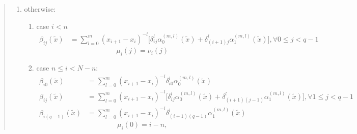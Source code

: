 \documentclass[11pt]{article}
\begin{document}
\begin{quotation}
\begin{enumerate}
\begin{enumerate}
                    \item
                        otherwise:
                        \begin{enumerate}
                            \item
                                case $i < n$
                                \begin{align}
                                    \beta_{ij}(\tilde{x}) &=
                                        \sum_{l = 0}^m
                                        (x_{i+1} - x_i)^{-l}
                                        \Big[\delta_{ij}^l \alpha_0^{(m, l)}(\tilde{x}) +
                                             \delta_{(i+1)j}^l \alpha_1^{(m, l)}(\tilde{x})\Big],
                                    \forall 0 \leq j < q - 1
                                \end{align}
                                \begin{equation}
                                    \mu_i(j) = \nu_i(j)
                                \end{equation}
                            \item
                                case $n \leq i < N - n$:
                                \begin{align}
                                    \beta_{i0}(\tilde{x}) &=
                                        \sum_{l = 0}^m
                                        (x_{i+1} - x_i)^{-l}
                                        \delta_{i0}^l \alpha_0^{(m, l)}(\tilde{x}) \\
                                    \beta_{ij}(\tilde{x}) &=
                                        \sum_{l = 0}^m
                                        (x_{i+1} - x_i)^{-l}
                                        \Big[\delta_{ij}^l \alpha_0^{(m, l)}(\tilde{x}) +
                                             \delta_{(i+1)(j-1)}^l \alpha_1^{(m, l)}(\tilde{x})\Big],
                                    \forall 1 \leq j < q-1 \\
                                    \beta_{i(q-1)}(\tilde{x}) &=
                                        \sum_{l = 0}^m
                                        (x_{i+1} - x_i)^{-l}
                                        \delta_{(i+1)(q-1)}^l \alpha_1^{(m, l)}(\tilde{x})
                                \end{align}
                                \begin{equation}
                                    \mu_i(0) = i-n,

\end{equation}
\end{enumerate}
\end{enumerate}
\end{enumerate}
\end{quotation}
\end{document}
